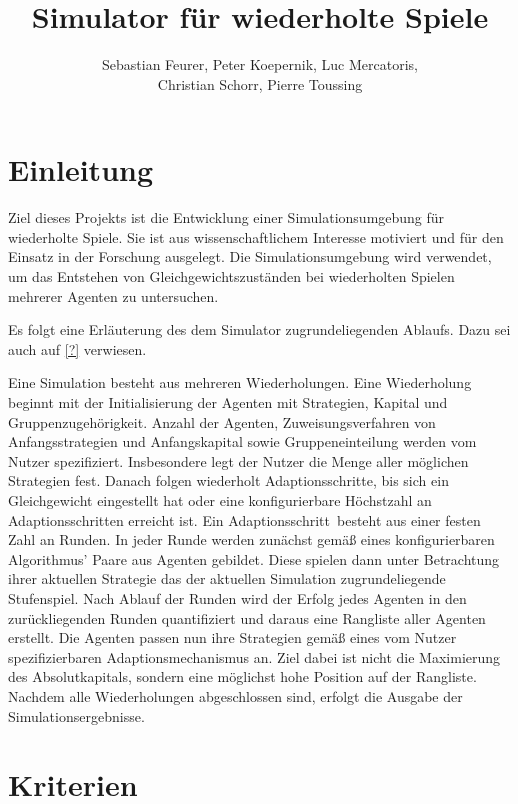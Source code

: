 \documentclass[parskip=full,11pt]{scrartcl}
\title{Simulator für wiederholte Spiele}
\author{Sebastian Feurer, Peter Koepernik, Luc Mercatoris,\\Christian Schorr, Pierre Toussing}
\def\adapt{Adaptionsschritt}
\def\adapts{Adaptionsschritte}
\begin{document}
\maketitle

\section{Einleitung}

Ziel dieses Projekts ist die Entwicklung einer Simulationsumgebung für wiederholte Spiele. Sie ist aus wissenschaftlichem Interesse motiviert und für den Einsatz in der Forschung ausgelegt. Die Simulationsumgebung wird verwendet, um das Entstehen von Gleichgewichtszuständen bei wiederholten Spielen mehrerer Agenten zu untersuchen. 

Es folgt eine Erläuterung des dem Simulator zugrundeliegenden Ablaufs. Dazu sei auch auf \cref{?} verwiesen.

Eine Simulation besteht aus mehreren Wiederholungen. Eine Wiederholung beginnt mit der Initialisierung der Agenten mit Strategien, Kapital und Gruppenzugehörigkeit. Anzahl der Agenten, Zuweisungsverfahren von Anfangsstrategien und Anfangskapital sowie Gruppeneinteilung werden vom Nutzer spezifiziert. Insbesondere legt der Nutzer die Menge aller möglichen Strategien fest. Danach folgen wiederholt \adapts, bis sich ein Gleichgewicht eingestellt hat oder eine konfigurierbare Höchstzahl an \adapts n erreicht ist. Ein \adapt\ besteht aus einer festen Zahl an Runden. In jeder Runde werden zunächst gemäß eines konfigurierbaren Algorithmus' Paare aus Agenten gebildet. Diese spielen dann unter Betrachtung ihrer aktuellen Strategie das der aktuellen Simulation zugrundeliegende Stufenspiel. Nach Ablauf der Runden wird der Erfolg jedes Agenten in den zurückliegenden Runden quantifiziert und daraus eine Rangliste aller Agenten erstellt. Die Agenten passen nun ihre Strategien gemäß eines vom Nutzer spezifizierbaren Adaptionsmechanismus an. Ziel dabei ist nicht die Maximierung des Absolutkapitals, sondern eine möglichst hohe Position auf der Rangliste.\newline
Nachdem alle Wiederholungen abgeschlossen sind, erfolgt die Ausgabe der Simulationsergebnisse.

\pagebreak
\section{Kriterien}
\end{document}
